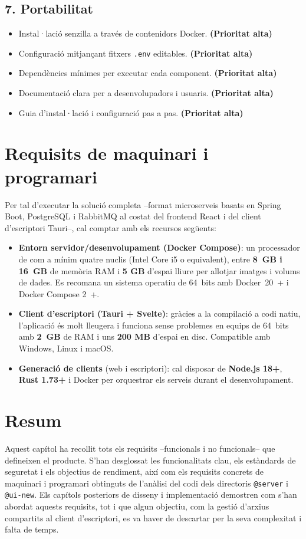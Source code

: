 \subsection{7. Portabilitat}
\begin{itemize}
  \item Instal·lació senzilla a través de contenidors Docker. \textbf{(Prioritat alta)}
  \item Configuració mitjançant fitxers \texttt{.env} editables. \textbf{(Prioritat alta)}
  \item Dependències mínimes per executar cada component. \textbf{(Prioritat alta)}
  \item Documentació clara per a desenvolupadors i usuaris. \textbf{(Prioritat alta)}
  \item Guia d'instal·lació i configuració pas a pas. \textbf{(Prioritat alta)}
\end{itemize}

\section{Requisits de maquinari i programari}
Per tal d'executar la solució completa –format microserveis basats en Spring Boot, PostgreSQL i RabbitMQ al costat del frontend React i del client d'escriptori Tauri–, cal comptar amb els recursos següents:
\begin{itemize}
  \item \textbf{Entorn servidor/desenvolupament (Docker Compose)}: un processador de com a mínim quatre nuclis (Intel Core i5 o equivalent), entre \textbf{8~GB i 16~GB} de memòria RAM i \textbf{5 GB} d'espai lliure per allotjar imatges i volums de dades. Es recomana un sistema operatiu de 64~bits amb Docker~20~+ i Docker Compose 2~+.
  \item \textbf{Client d'escriptori (Tauri + Svelte)}: gràcies a la compilació a codi natiu, l'aplicació és molt lleugera i funciona sense problemes en equips de 64~bits amb \textbf{2~GB} de RAM i uns \textbf{200 MB} d'espai en disc. Compatible amb Windows, Linux i macOS.
  \item \textbf{Generació de clients} (web i escriptori): cal disposar de \textbf{Node.js 18+}, \textbf{Rust 1.73+} i Docker per orquestrar els serveis durant el desenvolupament.
\end{itemize}

\section{Resum}
Aquest capítol ha recollit tots els requisits –funcionals i no funcionals– que defineixen el producte. S'han desglossat les funcionalitats clau, els estàndards de seguretat i els objectius de rendiment, així com els requisits concrets de maquinari i programari obtinguts de l'anàlisi del codi dels directoris \texttt{@server} i \texttt{@ui-new}. Els capítols posteriors de disseny i implementació demostren com s'han abordat aquests requisits, tot i que algun objectiu, com la gestió d'arxius compartits al client d'escriptori, es va haver de descartar per la seva complexitat i falta de temps.

